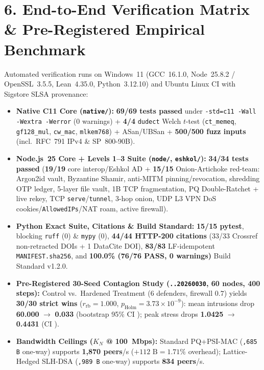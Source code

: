\documentclass[10pt,letterpaper]{article}
\newcommand{\code}[1]{\texttt{\fontsize{7.8pt}{9.2pt}\selectfont #1}}
\begin{document}
\section{6. End-to-End Verification Matrix \& Pre-Registered Empirical Benchmark}
Automated verification runs on Windows~11 (GCC~16.1.0, Node~25.8.2 / OpenSSL~3.5.5, Lean~4.35.0, Python~3.12.10) and Ubuntu Linux CI with Sigstore SLSA provenance:
{\fontsize{7.55pt}{8.95pt}\selectfont
\begin{itemize}[leftmargin=1.15em,itemsep=0.6pt,topsep=0.6pt,parsep=0pt]
  \item \textbf{Native C11 Core (\code{native/}):} \textbf{69/69 tests passed} under \code{-std=c11 -Wall -Wextra -Werror} (0 warnings) + \textbf{4/4} \code{dudect} Welch $t$-test (\code{ct\_memeq}, \code{gf128\_mul}, \code{cw\_mac}, \code{mlkem768}) + ASan/UBSan + \textbf{500/500 fuzz inputs} (incl.\ RFC~791 IPv4 \& SP~800-90B).
  \item \textbf{Node.js~25 Core + Levels 1--3 Suite (\code{node/}, \code{eshkol/}):} \textbf{34/34 tests passed} (\textbf{19/19} core interop/Eshkol AD + \textbf{15/15} Onion-Artichoke red-team: Argon2id vault, Byzantine Shamir, anti-MITM pinning/revocation, shredding OTP ledger, 5-layer file vault, 1B TCP fragmentation, PQ Double-Ratchet + live rekey, TCP \code{serve}/\code{tunnel}, 3-hop onion, UDP L3 VPN DoS cookies/\code{AllowedIPs}/NAT roam, active firewall).
  \item \textbf{Python Exact Suite, Citations \& Build Standard:} \textbf{15/15 pytest}, blocking \code{ruff} (0) \& \code{mypy} (0), \textbf{44/44 HTTP-200 citations} (33/33 Crossref non-retracted DOIs + 1 DataCite DOI), \textbf{83/83} LF-idempotent \code{MANIFEST.sha256}, and \textbf{100.0\% (76/76 PASS, 0 warnings)} Build Standard v1.2.0.
  \item \textbf{Pre-Registered 30-Seed Contagion Study (\code{20260001..20260030}, 60 nodes, 400 steps):} Control vs.\ Hardened Treatment (6 defenders, firewall $0.7$) yields \textbf{30/30 strict wins} ($r_{\mathrm{rb}}=1.000$, $p_{\mathrm{Holm}} = 3.73\times 10^{-9}$): mean intrusions drop \textbf{60.000} $\to$ \textbf{0.033} (bootstrap 95\% CI \code{[59.900, 60.000]}); peak stress drops \textbf{1.0425} $\to$ \textbf{0.4431} (CI \code{[0.5794, 0.6198]}).
  \item \textbf{Bandwidth Ceilings ($K_N$ @ 100~Mbps):} Standard PQ+PSI-MAC (\code{6,685 B} one-way) supports \textbf{1,870 peers}/s ($+112\text{ B} = 1.71\%$ overhead); Lattice-Hedged SLH-DSA (\code{14,989 B} one-way) supports \textbf{834 peers}/s.
\end{itemize}}
\vspace{0.5pt}
\end{document}
